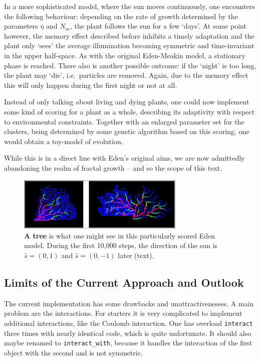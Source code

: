 \documentclass[twocolumn,10pt]{scrartcl}
\begin{document}
                In a more sophisticated model, where the sun moves continuously, one encounters the following
                behaviour: depending on the rate of growth determined by the parameters $\eta$ and $N_m$, the
                plant follows the sun for a few `days'. At some point however, the memory effect described before
                inhibits a timely adaptation and the plant only `sees' the average illumination becoming
                symmetric and time-invariant in the upper half-space. As with the original Eden-Meakin model, a
                stationary phase is reached. There also is another possible outcome: if the `night' is too long,
                the plant may `die', i.e.\ particles are removed. Again, due to the memory effect this will
                only happen during the first night or not at all.

                Instead of only talking about living and dying plants, one could now implement some kind of
                scoring for a plant as a whole, describing its adaptivity with respect to environmental constraints.
                Together with an enlarged parameter set for the clusters, being determined by some genetic
                algorithm based on this scoring, one would obtain a toy-model of evolution.

                While this is in a direct line with Eden's original aims, we are now admittedly abandoning
                the realm of fractal growth -- and so the scope of this text.

        \begin{figure}
            \center
            \includegraphics[width=8cm]{img/edentree.png}
            \caption[A tree]
                {\small\textbf{A tree} is what one might see in this particularly scored Eden model. During
                the first 10,000 steps, the direction of the sun is $\hat s=(0,1)$ and $\hat s=(0,-1)$ later
                (text).}
            \label{fig-edentree}
        \end{figure}

        \subsection{Limits of the Current Approach and Outlook}
            \label{sec-limits}
            The current implementation has some drawbacks and unattractivenesses. A main problem are the
            interactions. For starters it is very complicated to implement additional interactions, like the Coulomb
            interaction. One has overload \lstinline'interact' three times with nearly identical code, which is
            quite unfortunate. It should also maybe renamed to \lstinline'interact_with', because it handles the
            interaction of the first object with the second and is not symmetric.
\end{document}
